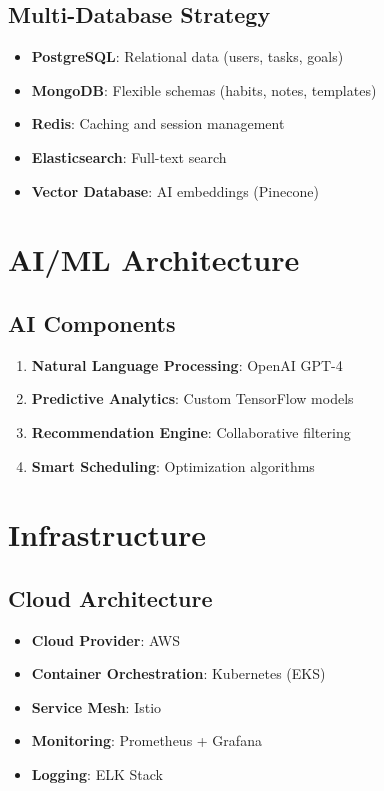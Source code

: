 \subsection{Multi-Database Strategy}

\begin{itemize}
    \item \textbf{PostgreSQL}: Relational data (users, tasks, goals)
    \item \textbf{MongoDB}: Flexible schemas (habits, notes, templates)
    \item \textbf{Redis}: Caching and session management
    \item \textbf{Elasticsearch}: Full-text search
    \item \textbf{Vector Database}: AI embeddings (Pinecone)
\end{itemize}

\section{AI/ML Architecture}

\subsection{AI Components}

\begin{enumerate}
    \item \textbf{Natural Language Processing}: OpenAI GPT-4
    \item \textbf{Predictive Analytics}: Custom TensorFlow models
    \item \textbf{Recommendation Engine}: Collaborative filtering
    \item \textbf{Smart Scheduling}: Optimization algorithms
\end{enumerate}

\section{Infrastructure}

\subsection{Cloud Architecture}

\begin{itemize}
    \item \textbf{Cloud Provider}: AWS
    \item \textbf{Container Orchestration}: Kubernetes (EKS)
    \item \textbf{Service Mesh}: Istio
    \item \textbf{Monitoring}: Prometheus + Grafana
    \item \textbf{Logging}: ELK Stack
\end{itemize}

